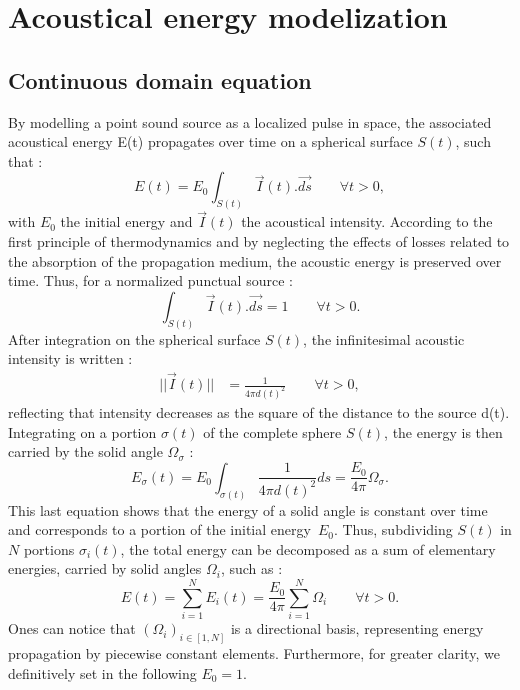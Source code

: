 \documentclass[AMA,STIX1COL]{WileyNJD-v2}
\begin{document}
\section{Acoustical energy modelization}\label{sec2}
\subsection{Continuous domain equation}

By modelling a point sound source as a localized pulse in space, the associated acoustical energy E(t) propagates \cite{jouhaneau} over time on a spherical surface $S(t)$, such that :
%
\begin{equation} 
E(t) = E_0 \int_{S(t)} \overrightarrow{I}(t).\overrightarrow{ds} \qquad \forall t > 0,
\end{equation}
%
with $E_0$ the initial energy and $\overrightarrow{I}(t)$ the acoustical intensity. According to the first principle of thermodynamics and by neglecting the effects of losses related to the absorption of the propagation medium, the acoustic energy is preserved over time. Thus, for a normalized punctual source :
%
\begin{equation} 
\int_{S(t)} \overrightarrow{I}(t).\overrightarrow{ds} = 1 \qquad \forall t > 0.
\end{equation}
%
After integration on the spherical surface $S(t)$, the infinitesimal acoustic intensity is written :
\begin{align} 
|| \overrightarrow{I}(t) || &= \frac{1}{4\pi d(t)^2} \qquad \forall t > 0,
\end{align}
%
reflecting that intensity decreases as the square of the distance to the source d(t). Integrating on a portion $\sigma(t)$ of the complete sphere $S(t)$, the energy is then carried by the solid angle $\Omega_{\sigma}$ :
%
\begin{equation}
E_{\sigma}(t) = E_0 \int_{\sigma(t)}  \frac{1}{4\pi  d(t)^2} ds = \frac{E_0}{4\pi}  \Omega_{\sigma}.
\label{eq_4}
\end{equation}
%
This last equation shows that the energy of a solid angle is constant over time and corresponds to a portion of the initial energy~$E_0$. Thus, subdividing $S(t)$ in $N$ portions $\sigma_i(t)$, the total energy can be decomposed as a sum of elementary energies, carried by solid angles $\Omega_i$, such as : 
%
\begin{equation}
E(t) = \sum_{i=1}^N E_i(t) = \frac{E_0}{4\pi}  \sum_{i=1}^N \Omega_i  \qquad \forall t > 0.
\label{eq_5}
\end{equation}
Ones can notice that $(\Omega_i)_{i\in[1,N] }$ is a directional basis, representing energy propagation by piecewise constant elements. Furthermore, for greater clarity, we definitively set in the following $E_0 = 1$.
\end{document}
